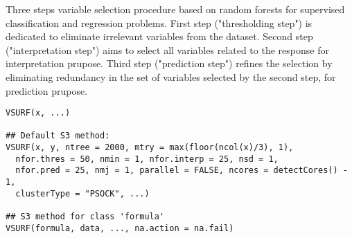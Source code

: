 \documentclass[11pt]{article}
\begin{document}
%
\begin{Description}\relax
Three steps variable selection procedure based on random forests for
supervised classification and regression problems.  First step
("thresholding step") is dedicated to eliminate irrelevant variables from
the dataset.  Second step ("interpretation step") aims to select all
variables related to the response for interpretation prupose.  Third step
("prediction step") refines the selection by eliminating redundancy in the
set of variables selected by the second step, for prediction prupose.
\end{Description}
%
\begin{Usage}
\begin{verbatim}
VSURF(x, ...)

## Default S3 method:
VSURF(x, y, ntree = 2000, mtry = max(floor(ncol(x)/3), 1),
  nfor.thres = 50, nmin = 1, nfor.interp = 25, nsd = 1,
  nfor.pred = 25, nmj = 1, parallel = FALSE, ncores = detectCores() - 1,
  clusterType = "PSOCK", ...)

## S3 method for class 'formula'
VSURF(formula, data, ..., na.action = na.fail)
\end{verbatim}
\end{Usage}
%
\end{document}
